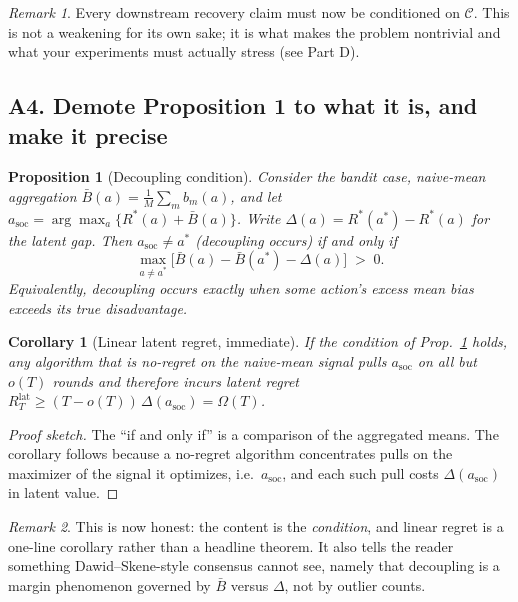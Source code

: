 \documentclass[11pt]{article}
\newtheorem{proposition}{Proposition}
\newtheorem{corollary}{Corollary}
\theoremstyle{definition}
\theoremstyle{remark}
\newtheorem{remark}{Remark}
\newcommand{\Rstar}{R^{\ast}}
\newcommand{\astar}{a^{\ast}}
\newcommand{\asoc}{a_{\mathrm{soc}}}
\newcommand{\Cov}{\mathcal{C}}
\newcommand{\bias}{\bar B}
\begin{document}
\begin{remark}
Every downstream recovery claim must now be conditioned on $\Cov$. This is not a weakening
for its own sake; it is what makes the problem nontrivial and what your experiments must
actually stress (see Part D).
\end{remark}

\subsection*{A4. Demote Proposition 1 to what it is, and make it precise}

\begin{proposition}[Decoupling condition]
\label{prop:decoupling}
Consider the bandit case, naive-mean aggregation
$\bias(a)=\tfrac1M\sum_{m}b_m(a)$, and let $\asoc=\arg\max_a\{\Rstar(a)+\bias(a)\}$.
Write $\Delta(a)=\Rstar(\astar)-\Rstar(a)$ for the latent gap. Then $\asoc\neq\astar$ (decoupling occurs) if and only if
\[
\max_{a\neq \astar}\big[\bias(a)-\bias(\astar)-\Delta(a)\big] \;>\; 0 .
\]
Equivalently, decoupling occurs exactly when some action's excess mean bias exceeds its
true disadvantage.
\end{proposition}

\begin{corollary}[Linear latent regret, immediate]
\label{cor:linreg}
If the condition of Prop.~\ref{prop:decoupling} holds, any algorithm that is no-regret on the
naive-mean signal pulls $\asoc$ on all but $o(T)$ rounds and therefore incurs latent regret
$R^{\mathrm{lat}}_T \ge (T-o(T))\,\Delta(\asoc)=\Omega(T)$.
\end{corollary}

\begin{proof}[Proof sketch]
The ``if and only if'' is a comparison of the aggregated means. The corollary follows because a
no-regret algorithm concentrates pulls on the maximizer of the signal it optimizes, i.e.\ $\asoc$,
and each such pull costs $\Delta(\asoc)$ in latent value.
\end{proof}

\begin{remark}
This is now honest: the content is the \emph{condition}, and linear regret is a one-line
corollary rather than a headline theorem. It also tells the reader something Dawid--Skene-style
consensus cannot see, namely that decoupling is a margin phenomenon governed by $\bias$ versus
$\Delta$, not by outlier counts.
\end{remark}
\end{document}
